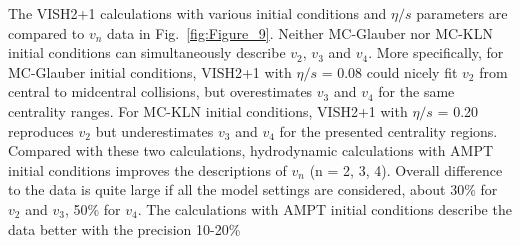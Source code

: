 The VISH2+1 calculations with various initial conditions and $\eta/s$ parameters are compared to $v_n$ data in Fig.~\ref{fig:Figure_9}.
Neither MC-Glauber nor MC-KLN initial conditions can simultaneously describe $v_2$, $v_3$ and $v_4$. More specifically, for MC-Glauber initial conditions, VISH2+1 with $\eta/s$ = 0.08 could nicely fit $v_2$ from central to midcentral collisions, but overestimates $v_3$ and $v_4$ for the same centrality ranges. For MC-KLN initial conditions, VISH2+1 with $\eta/s$ = 0.20 reproduces $v_2$ but underestimates $v_3$ and $v_4$ for the presented centrality regions. Compared with these two calculations, hydrodynamic calculations with AMPT initial conditions improves the descriptions of $v_n$ (n = 2, 3, 4). Overall difference to the data is quite large if all the model settings are considered, about 30\% for $v_2$ and $v_3$,  50\% for $v_4$. The calculations with AMPT initial conditions describe the data better with the precision 10-20\%

